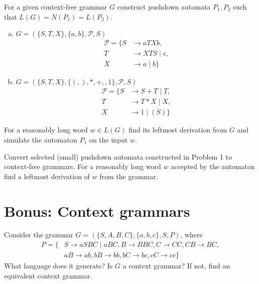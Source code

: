 \documentclass[a4paper,12pt]{amsart}
\begin{document}
\medskip\begin{problem}

    For a given context-free grammar $G$ construct pushdown automata $P_1,P_2$ such that $L(G)=N(P_1)=L(P_2)$.

    \bigskip

    \begin{enumerate}[(a)]\setlength\itemsep{12pt}
        \item $G=(\{S,T,X\},\{a,b\},\mathcal P,S)$
            \begin{align*}
        \mathcal P=\{S&\rightarrow aTXb, \\
        T&\rightarrow XTS\mid \epsilon,\\ 
        X&\rightarrow a\mid b\}
        \end{align*}
        \item $G=(\{S,T,X\},\{(,),*,+,,1\},\mathcal P,S)$
            \begin{align*}
        \mathcal P=\{S&\rightarrow S+T\mid T, \\
        T&\rightarrow T*X\mid X,\\ 
        X&\rightarrow 1\mid (S)\}
        \end{align*}
    \end{enumerate}

    For a reasonably long word $w\in L(G)$ find its leftmost derivation from $G$ and simulate the automaton  $P_1$ on the input $w$.

\end{problem}
    

\medskip\begin{problem}

    Convert selected (small) pushdown automata constructed in Problem 1 to context-free grammars. For a reasonably long word $w$ accepted by the automaton find a leftmost derivation of $w$ from the grammar.

\end{problem}


\section*{Bonus: Context grammars}


\medskip\begin{problem}
    
    Consider the grammar $G=(\{S,A,B,C\},\{a,b,c\},S,P)$, where
    \begin{align*}
        P=\{&S\rightarrow aSBC\mid aBC, B\rightarrow BBC,  C\rightarrow CC, CB\rightarrow BC,\\ 
        &aB\rightarrow ab, bB\rightarrow bb, bC\rightarrow bc, cC\rightarrow cc\}
    \end{align*}
    What language does it generate? Is $G$ a context grammar? If not, find an equivalent context grammar.
    
\end{problem}
\end{document}
